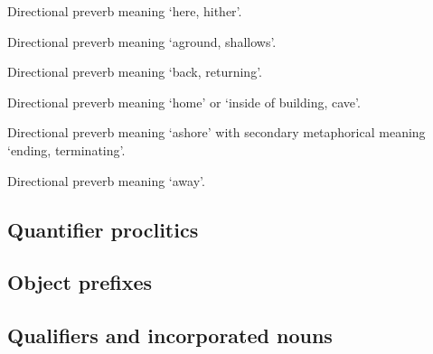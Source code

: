 \begin{morphdesc}
\item[\X{haat=}]
\item[\X{haax̱=}]
\item[\X{haadé=}]
\item[\X{haandé=}]
	Directional preverb meaning ‘here, hither’.

\item[\X{kux=}]
\item[\X{kuxx̱=}]
\item[\X{kúxde=}]
	Directional preverb meaning ‘aground, shallows’.

\item[\X{ḵux̱=}]
\item[\X{ḵúx̱de=}]
	Directional preverb meaning ‘back, returning’.

\item[\X{neil=}]
\item[\X{neilt=}]
\item[\X{neilx̱=}]
\item[\X{neildé=}]
	Directional preverb meaning ‘home’ or ‘inside of building, cave’.
	
\item[\X{ÿan=}]
\item[{\X[ÿax̱=ashore]{ÿax̱=}}]
\item[\X{ÿánde=}]
	Directional preverb meaning ‘ashore’ with secondary metaphorical meaning ‘ending, terminating’.

\item[\X{yóot=}]
\item[\X{yóox̱=}]
\item[\X{yóode=}]
	Directional preverb meaning ‘away’.
\end{morphdesc}

\subsection{Quantifier proclitics}\label{sec:inventory-qfr}

\subsection{Object prefixes}\label{sec:inventory-object}

\subsection{Qualifiers and incorporated nouns}\label{sec:inventory-qualinc}

